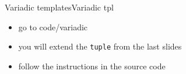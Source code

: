 \begin{frame}[fragile]
  \begin{exerciseWithShortcut}{Variadic templates}{Variadic tpl}
    \begin{itemize}
    \item go to code/variadic
    \item you will extend the \texttt{tuple} from the last slides
    \item follow the instructions in the source code
    \end{itemize}
  \end{exerciseWithShortcut}
\end{frame}

